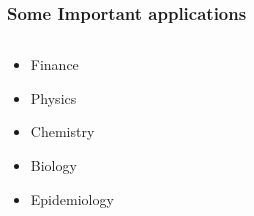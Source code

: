 \begin{frame}
    \frametitle{Some Important applications}
    \begin{columns}
        \begin{overlayarea}{\textwidth}{.3\textheight}
            \begin{itemize}[<+-|alert@+>] 	
                \item
                    Finance
                    \item
                    Physics
                \item
                    Chemistry
                \item 
                    Biology
                \item
                    Epidemiology
            \end{itemize}
        \end{overlayarea}
        \begin{overlayarea}{\textwidth}{.5\textheight}
            \begin{exampleblock}{
                    
}
\end{exampleblock}
\end{overlayarea}
\end{columns}
\end{frame}
